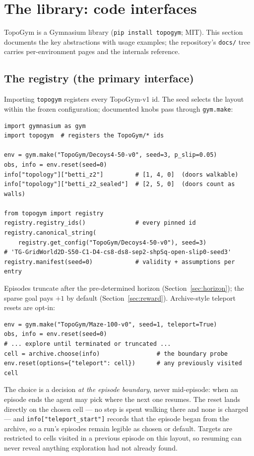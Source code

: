 \documentclass[11pt]{article}
\begin{document}
\section{The library: code interfaces}
\label{sec:code}

TopoGym is a Gymnasium library (\texttt{pip install topogym}; MIT).
This section documents the key abstractions with usage examples; the
repository's \texttt{docs/} tree carries per-environment pages and
the internals reference.

\subsection{The registry (the primary interface)}

Importing \texttt{topogym} registers every TopoGym-v1 id. The seed
selects the layout within the frozen configuration; documented knobs
pass through \texttt{gym.make}:

\begin{lstlisting}
import gymnasium as gym
import topogym  # registers the TopoGym/* ids

env = gym.make("TopoGym/Decoys4-50-v0", seed=3, p_slip=0.05)
obs, info = env.reset(seed=0)
info["topology"]["betti_z2"]         # [1, 4, 0]  (doors walkable)
info["topology"]["betti_z2_sealed"]  # [2, 5, 0]  (doors count as walls)

from topogym import registry
registry.registry_ids()              # every pinned id
registry.canonical_string(
    registry.get_config("TopoGym/Decoys4-50-v0"), seed=3)
# 'TG-GridWorld2D-S50-C1-D4-cs8-ds8-sep2-shpSq-open-slip0-seed3'
registry.manifest(seed=0)            # validity + assumptions per entry
\end{lstlisting}

Episodes truncate after the pre-determined horizon
(Section~\ref{sec:horizon}); the
sparse goal pays $+1$ by default (Section~\ref{sec:reward}).
Archive-style teleport resets are opt-in:

\begin{lstlisting}
env = gym.make("TopoGym/Maze-100-v0", seed=1, teleport=True)
obs, info = env.reset(seed=0)
# ... explore until terminated or truncated ...
cell = archive.choose(info)                # the boundary probe
env.reset(options={"teleport": cell})      # any previously visited cell
\end{lstlisting}

\noindent The choice is a decision \emph{at the episode boundary},
never mid-episode: when an episode ends the agent may pick where the
next one resumes. The reset lands directly on the chosen cell --- no
step is spent walking there and none is charged --- and
\texttt{info["teleport\_start"]} records that the episode began from
the archive, so a run's episodes remain legible as chosen or default.
Targets are restricted to cells visited in a previous episode on this
layout, so resuming can never reveal anything exploration had not
already found.
\end{document}
